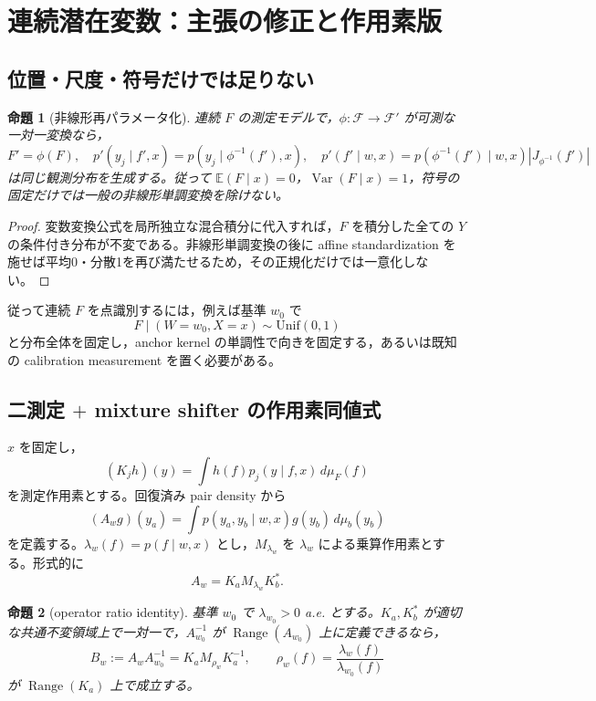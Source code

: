 \documentclass[11pt,a4paper]{ltjsarticle}
\newtheorem{proposition}{命題}[section]
\theoremstyle{remark}\newtheorem{remark}{注意}[section]
\newcommand{\E}{\mathbb E}
\newcommand{\cF}{\mathcal F}
\newcommand{\Range}{\operatorname{Range}}
\begin{document}
\section{連続潜在変数：主張の修正と作用素版}

\subsection{位置・尺度・符号だけでは足りない}
\begin{proposition}[非線形再パラメータ化]\label{prop:reparam}
連続 $F$ の測定モデルで，$\phi:\cF\to\cF'$ が可測な一対一変換なら，
\[
F'=\phi(F),\quad
p'(y_j\mid f',x)=p(y_j\mid\phi^{-1}(f'),x),\quad
p'(f'\mid w,x)=p(\phi^{-1}(f')\mid w,x)|J_{\phi^{-1}}(f')|
\]
は同じ観測分布を生成する。従って $\E(F\mid x)=0$，$\operatorname{Var}(F\mid x)=1$，符号の固定だけでは一般の非線形単調変換を除けない。
\end{proposition}

\begin{proof}
変数変換公式を局所独立な混合積分に代入すれば，$F$ を積分した全ての $Y$ の条件付き分布が不変である。非線形単調変換の後に affine standardization を施せば平均0・分散1を再び満たせるため，その正規化だけでは一意化しない。
\end{proof}

従って連続 $F$ を点識別するには，例えば基準 $w_0$ で
\[
F\mid(W=w_0,X=x)\sim\mathrm{Unif}(0,1)
\]
と分布全体を固定し，anchor kernel の単調性で向きを固定する，あるいは既知の calibration measurement を置く必要がある。

\subsection{二測定 $+$ mixture shifter の作用素同値式}
$x$ を固定し，
\[
(K_jh)(y)=\int h(f)p_j(y\mid f,x)\,d\mu_F(f)
\]
を測定作用素とする。回復済み pair density から
\[
(A_wg)(y_a)=\int p(y_a,y_b\mid w,x)g(y_b)\,d\mu_b(y_b)
\]
を定義する。$\lambda_w(f)=p(f\mid w,x)$ とし，$M_{\lambda_w}$ を $\lambda_w$ による乗算作用素とする。形式的に
\begin{equation}
A_w=K_aM_{\lambda_w}K_b^*.
\label{eq:operator-factor}
\end{equation}

\begin{proposition}[operator ratio identity]\label{prop:operator}
基準 $w_0$ で $\lambda_{w_0}>0$ a.e. とする。$K_a,K_b^*$ が適切な共通不変領域上で一対一で，$A_{w_0}^{-1}$ が $\Range(A_{w_0})$ 上に定義できるなら，
\begin{equation}
B_w:=A_wA_{w_0}^{-1}
=K_aM_{\rho_w}K_a^{-1},
\qquad
\rho_w(f)=\frac{\lambda_w(f)}{\lambda_{w_0}(f)}
\label{eq:operator-ratio}
\end{equation}
が $\Range(K_a)$ 上で成立する。
\end{proposition}
\end{document}
